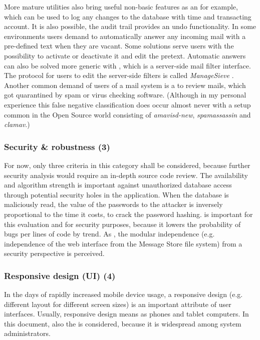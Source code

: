 \documentclass[12pt,a4paper]{scrartcl}
\begin{document}
				More mature utilities also bring useful non-basic features as
				an  for example, which can be used to
				log any changes to the database with time and transacting
				account. It is also possible, the audit trail provides an undo
				functionality. In some environments users demand  to automatically answer any incoming mail with
				a pre-defined text when they are vacant. Some solutions serve
				users with the possibility to activate or deactivate it and
				edit the pretext. Automatic answers can also be solved more
				generic with  \cite{sieve}, which is a
				server-side mail filter interface. The protocol for users to
				edit the server-side filters is called \emph{ManageSieve}
				\cite{managesieve}. Another common demand of users of a mail
				system is a  to review mails, which
				got quarantined by spam or virus checking software. (Although
				in my personal experience this false negative classification
				does occur almost never with a setup common in the Open Source
				world consisting of \emph{amavisd-new}, \emph{spamassassin} and
				\emph{clamav}.)

			\subsubsection{Security \& robustness (3)}
				For now, only three criteria in this category shall be
				considered, because further security analysis would require an
				in-depth source code review. The 
				availability and algorithm strength is important against
				unauthorized database access through potential security holes
				in the application. When the database is maliciously read, the
				value of the passwords to the attacker is inversely
				proportional to the time it costs, to crack the password
				hashing.  is important for this
				evaluation and for security purposes, because it lowers the
				probability of bugs per lines of code by trend. As
				, the modular independence (e.g.
				independence of the web interface from the Message Store file
				system) from a security perspective is perceived.

			\subsubsection{Responsive design (\acs{UI}) (4)}
				In the days of rapidly increased mobile device usage, a
				responsive design (e.g. different layout for different screen
				sizes) is an important attribute of user interfaces. Usually,
				responsive design means 
				as phones and tablet computers. In this document, also the
				 is considered,
				because it is widespread among system administrators.
\end{document}
